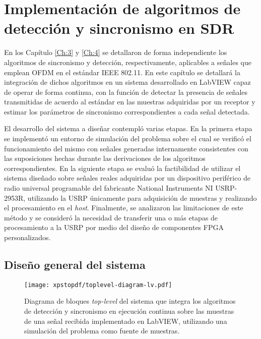 \chapter{Implementación de algoritmos de detección y sincronismo en SDR}
\label{Ch:5}
\graphicspath{{figs/}}

En los Capítulo \ref{Ch:3} y \ref{Ch:4} se detallaron de forma independiente los algoritmos de sincronismo y detección, respectivamente, aplicables a señales que emplean OFDM en el estándar IEEE 802.11. En este capítulo se detallará la integración de dichos algoritmos en un sistema desarrollado en LabVIEW capaz de operar de forma continua, con la función de detectar la presencia de señales transmitidas de acuerdo al estándar en las muestras adquiridas por un receptor y estimar los parámetros de sincronismo correspondientes a cada señal detectada. 

El desarrollo del sistema a diseñar contempló varias etapas. En la primera etapa se implementó un entorno de simulación del problema sobre el cual se verificó el funcionamiento del mismo con señales generadas internamente consistentes con las suposiciones hechas durante las derivaciones de los algoritmos correspondientes. En la siguiente etapa se evaluó la factibilidad de utilizar el sistema diseñado sobre señales reales adquiridas por un dispositivo periférico de radio universal programable del fabricante National Instruments NI USRP-2953R, utilizando la USRP únicamente para adquisición de muestras y realizando el procesamiento en el \textit{host}. Finalmente, se analizaron las limitaciones de este método y se consideró la necesidad de transferir una o más etapas de procesamiento a la USRP por medio del diseño de componentes FPGA personalizados.

\section{Diseño general del sistema}
\label{S:ch5-general}

\begin{figure}[t]
    \centering{}\texttt{[image: xpstopdf/toplevel-diagram-lv.pdf]}
    \caption[Diagrama de bloques \textit{top-level} del sistema que integra los algoritmos de detección y sincronismo implementado en LabVIEW.]{Diagrama de bloques \textit{top-level} del sistema que integra los algoritmos de detección y sincronismo en ejecución continua sobre las muestras de una señal recibida implementado en LabVIEW, utilizando una simulación del problema como fuente de muestras.\label{fig:top-level-lv}}  
\end{figure}

